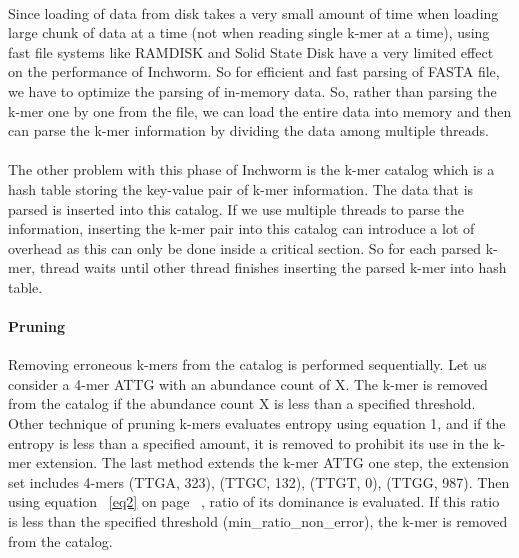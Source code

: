 \label{key}\documentclass[bachinf, english ,zihtitle,final,hyperref,utf8]{zihpub}
\begin{document}
\paragraph{}
Since loading of data from disk takes a very small amount of time when loading large chunk of data at a time (not when reading single k-mer at a time), using fast file systems like RAMDISK and Solid State Disk have a very limited effect on the performance of Inchworm. So for efficient and fast parsing of FASTA file, we have to optimize the parsing of in-memory data. So, rather than parsing the k-mer one by one from the file, we can load the entire data into memory and then can parse the k-mer information by dividing the data among multiple threads.
\paragraph{}
The other problem with this phase of Inchworm is the k-mer catalog which is a hash table storing the key-value pair of k-mer information. The data that is parsed is inserted into this catalog. If we use multiple threads to parse the information, inserting the k-mer pair into this catalog can introduce a lot of overhead as this can only be done inside a critical section. So for each parsed k-mer,  thread waits until other thread finishes inserting the parsed k-mer into hash table. 
\paragraph{Pruning} Removing erroneous k-mers from the catalog is performed sequentially.  Let us consider a 4-mer ATTG with an abundance count of X. The k-mer is removed from the catalog if the abundance count X is less than a specified threshold. Other technique of pruning k-mers evaluates entropy using equation 1, and if the entropy is less than a specified amount, it is removed to prohibit its use in the k-mer extension. The last method extends the k-mer ATTG one step, the extension set includes 4-mers {(TTGA, 323), (TTGC, 132), (TTGT, 0), (TTGG, 987)}. Then using equation ~\ref{eq2} on page ~\pageref{eq2}, ratio of its dominance is evaluated. If this ratio is less than the specified threshold (min\_ratio\_non\_error), the k-mer is removed from the catalog.
\end{document}
